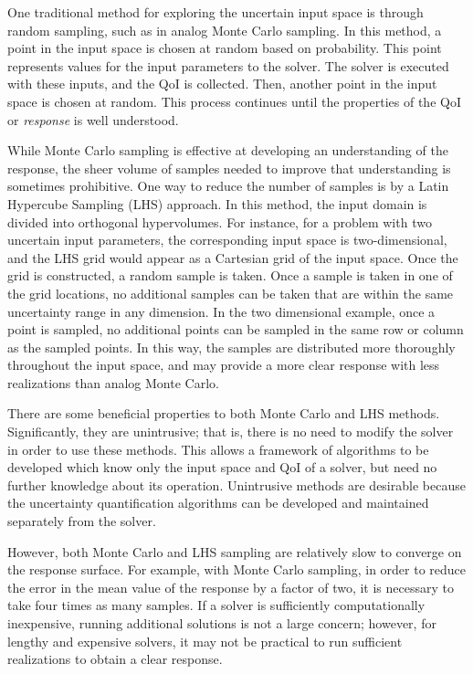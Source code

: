 One traditional method for exploring the uncertain input space is through random sampling, such as in analog Monte
Carlo sampling.  In this method, a point in the input space is chosen at random based on probability.  This
point represents values for the input parameters to the solver.  The solver is executed with these inputs, and
the QoI is collected.  Then, another point in the input space is chosen at random.  This process continues
until the properties of the QoI or \emph{response} is well understood.

While Monte Carlo sampling is effective at developing an understanding of the response, the sheer volume of
samples needed to improve that understanding is sometimes prohibitive.  One way to reduce the number of
samples is by a Latin Hypercube Sampling (LHS) approach.  In this method, the input domain is divided into
orthogonal hypervolumes.  For instance, for a problem with two uncertain input parameters, the corresponding
input space is two-dimensional, and the LHS grid would appear as a Cartesian grid of the input space.  Once
the grid is constructed, a random sample is taken.  Once a sample is taken in one of the grid locations, no
additional samples can be taken that are within the same uncertainty range in any dimension.  In the two
dimensional example, once a point is sampled, no additional points can be sampled in the same row or column as
the sampled points.  In this way, the samples are distributed more thoroughly throughout the input space, and
may provide a more clear response with less realizations than analog Monte Carlo.

There are some beneficial properties to both Monte Carlo and LHS methods.  Significantly, they are unintrusive; that
is, there is no need to modify the solver in order to use these methods.  This allows a framework of
algorithms to be developed which know only the input space and QoI of a solver, but need no further knowledge
about its operation.  Unintrusive methods are desirable because the uncertainty quantification algorithms can
be developed and maintained separately from the solver.

However, both Monte Carlo and LHS sampling are relatively slow to converge on the response surface.  For
example, with Monte Carlo sampling, in order to reduce the error in the mean value of the response by a factor
of two, it is necessary to take four times as many samples.  If a solver is sufficiently computationally
inexpensive, running additional solutions is not a large concern; however, for lengthy and expensive solvers,
it may not be practical to run sufficient realizations to obtain a clear response.

